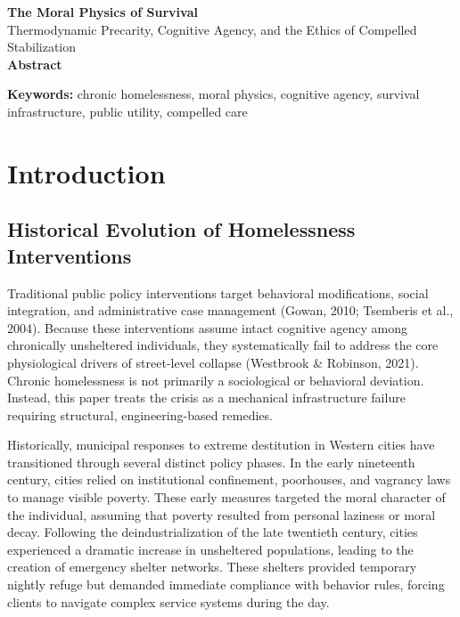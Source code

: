 \documentclass[12pt]{article}
\begin{document}
\begin{center}
{\LARGE \textbf{The Moral Physics of Survival}}\\[6pt]
{\large Thermodynamic Precarity, Cognitive Agency, and the Ethics of Compelled Stabilization}\\[1cm]
\textbf{Abstract}\\[0.5cm]
\end{center}

\noindent


\vspace{0.5cm}
\noindent \textbf{Keywords:} chronic homelessness, moral physics, cognitive agency, survival infrastructure, public utility, compelled care

\newpage

\section{Introduction}

\subsection{Historical Evolution of Homelessness Interventions}
Traditional public policy interventions target behavioral modifications, social integration, and administrative case management (Gowan, 2010; Tsemberis et al., 2004). Because these interventions assume intact cognitive agency among chronically unsheltered individuals, they systematically fail to address the core physiological drivers of street-level collapse (Westbrook \& Robinson, 2021). Chronic homelessness is not primarily a sociological or behavioral deviation. Instead, this paper treats the crisis as a mechanical infrastructure failure requiring structural, engineering-based remedies.

Historically, municipal responses to extreme destitution in Western cities have transitioned through several distinct policy phases. In the early nineteenth century, cities relied on institutional confinement, poorhouses, and vagrancy laws to manage visible poverty. These early measures targeted the moral character of the individual, assuming that poverty resulted from personal laziness or moral decay. Following the deindustrialization of the late twentieth century, cities experienced a dramatic increase in unsheltered populations, leading to the creation of emergency shelter networks. These shelters provided temporary nightly refuge but demanded immediate compliance with behavior rules, forcing clients to navigate complex service systems during the day.
\end{document}
